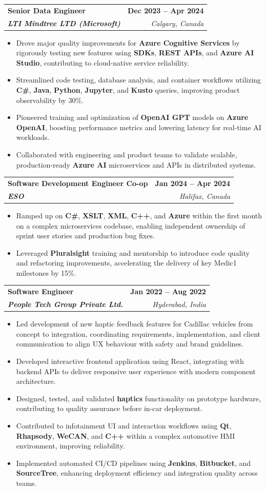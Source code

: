 \documentclass[letterpaper,11pt]{article}
\makeatletter
\newcommand{\resumeItem}[1]{
  \item\small{
    {#1 \vspace{-2pt}}
  }
}
\newcommand{\resumeSubheading}[4]{
  \vspace{-2pt}\item
    \begin{tabular*}{1.0\textwidth}[t]{l@{\extracolsep{\fill}}r}
      \textbf{#1} & \textbf{\small #2} \\
      \textit{\small#3} & \textit{\small #4} \\
    \end{tabular*}\vspace{-7pt}
}
\newcommand{\resumeItemListStart}{\begin{itemize}}
\newcommand{\resumeItemListEnd}{\end{itemize}\vspace{-5pt}}
\makeatother
\begin{document}
    \resumeSubheading
      {\textbf{Senior Data Engineer}}{\textbf{Dec 2023 -- Apr 2024}}
      {\textbf{LTI Mindtree LTD (Microsoft)}}{Calgary, Canada}
      \resumeItemListStart
        \resumeItem{Drove major quality improvements for \textbf{Azure Cognitive Services} by rigorously testing new features using \textbf{SDKs}, \textbf{REST APIs}, and \textbf{Azure AI Studio}, contributing to cloud-native service reliability.}
        \resumeItem{Streamlined code testing, database analysis, and container workflows utilizing \textbf{C\#}, \textbf{Java}, \textbf{Python}, \textbf{Jupyter}, and \textbf{Kusto} queries, improving product observability by 30\%.}
        \resumeItem{Pioneered training and optimization of \textbf{OpenAI GPT} models on \textbf{Azure OpenAI}, boosting performance metrics and lowering latency for real-time AI workloads.}
        \resumeItem{Collaborated with engineering and product teams to validate scalable, production-ready \textbf{Azure AI} microservices and APIs in distributed systems.}
      \resumeItemListEnd
    
    \resumeSubheading
      {\textbf{Software Development Engineer Co-op}}{\textbf{Jan 2024 -- Apr 2024}}
      {\textbf{ESO}}{Halifax, Canada}
      \resumeItemListStart
        \resumeItem{Ramped up on \textbf{C\#}, \textbf{XSLT}, \textbf{XML}, \textbf{C++}, and \textbf{Azure} within the first month on a complex microservices codebase, enabling independent ownership of sprint user stories and production bug fixes.}
        \resumeItem{Leveraged \textbf{Pluralsight} training and mentorship to introduce code quality and refactoring improvements, accelerating the delivery of key Medic1 milestones by 15\%.}
      \resumeItemListEnd

    \resumeSubheading
      {\textbf{Software Engineer}}{\textbf{Jan 2022 -- Aug 2022}}
      {\textbf{People Tech Group Private Ltd.}}{Hyderabad, India}
      \resumeItemListStart
        \resumeItem{Led development of new haptic feedback features for Cadillac vehicles from concept to integration, coordinating requirements, implementation, and client communication to align UX behaviour with safety and brand guidelines.}
        \resumeItem{Developed interactive frontend application using React, integrating with backend APIs to deliver responsive user experience with modern component architecture.}
        \resumeItem{Designed, tested, and validated \textbf{haptics} functionality on prototype hardware, contributing to quality assurance before in-car deployment.}
        \resumeItem{Contributed to infotainment UI and interaction workflows using \textbf{Qt}, \textbf{Rhapsody}, \textbf{WeCAN}, and \textbf{C++} within a complex automotive HMI environment, improving reliability.}
        \resumeItem{Implemented automated CI/CD pipelines using \textbf{Jenkins}, \textbf{Bitbucket}, and \textbf{SourceTree}, enhancing deployment efficiency and integration quality across teams.}
      \resumeItemListEnd
\end{document}
